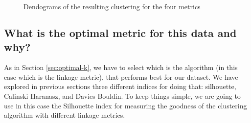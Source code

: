 \documentclass[12pt]{article}
\begin{document}
\begin{figure} [H]
{}
\hspace{0mm}
\caption{Dendograms of the resulting clustering for the four metrics}
\label{fig:hierarchical-clusters}
\end{figure}

\subsection{What is the optimal metric for this data and why?}

As in Section \ref{sec:optimal-k}, we have to select which is the algorithm (in this case which is the linkage metric), that performs best for our dataset. We have explored in previous sections three different indices for doing that: silhouette, Calinski-Haranasz, and Davies-Bouldin. To keep things simple, we are going to use in this case the Silhouette index for measuring the goodness of the clustering algorithm with different linkage metrics.
\end{document}

